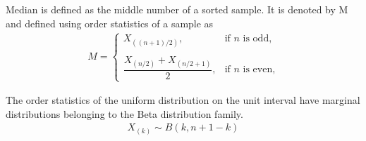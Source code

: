     \begin{definition}
    Median is defined as the middle number of a sorted sample. It is denoted by M and defined using order statistics of a sample as
    \begin{align}
      M =
      \begin{cases}
       X_{((n+1)/2)},                                           &\text{if $n$ is odd,} \\ \\
      \dfrac{ X_{(n/2)} + X_{(n/2+1)}}{2} ,                     &\text{if $n$ is even,} 
      \end{cases}
    \end{align}
    \label{stats/8/median}\label{stats/8/def2}
    \end{definition}
    \begin{remark}
    The order statistics of the uniform distribution on the unit interval have marginal distributions belonging to the Beta distribution family.
    \begin{align}
    X_{(k)} \sim B(k,n+1-k)
    \end{align}\label{stats/8/rem}
    \end{remark}
